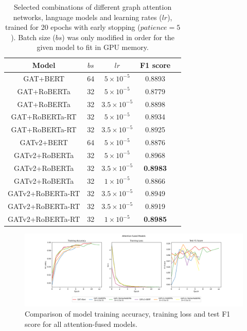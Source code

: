 \documentclass[letterpaper]{article} %
\begin{document}
\begin{table}
    \begin{tabular}{|c|c|c|c|c|}
        \hline
        \hline 
        Model & $bs$ & $lr$ & F1 score \\
        \hline
        GAT+BERT & 64 & $5\times10^{-5}$ &  0.8893 \\
        GAT+RoBERTa & 32 & $5\times10^{-5}$ &  0.8779 \\
        GAT+RoBERTa & 32 & $3.5\times10^{-5}$ &  0.8898 \\
        GAT+RoBERTa-RT & 32 & $5\times10^{-5}$  & 0.8934 \\
        GAT+RoBERTa-RT & 32 & $3.5\times10^{-5}$  & 0.8925 \\
        GATv2+BERT & 64 & $5\times10^{-5}$  & 0.8876 \\
        GATv2+RoBERTa & 32 & $5\times10^{-5}$ &  0.8968 \\
        GATv2+RoBERTa & 32 & $3.5\times10^{-5}$ &  \textbf{0.8983} \\
        GATv2+RoBERTa & 32 & $1\times10^{-5}$ &  0.8866 \\
        GATv2+RoBERTa-RT & 32 & $3.5\times10^{-5}$  & 0.8949 \\
        GATv2+RoBERTa-RT & 32 & $3.5\times10^{-5}$  & 0.8919 \\
        GATv2+RoBERTa-RT & 32 & $1\times10^{-5}$  & \textbf{0.8985} \\
        \hline
    \end{tabular}
    \caption{Selected combinations of different graph attention networks, language models and learning rates ($lr$), trained for 20 epochs with early stopping ($patience=5$). Batch size ($bs$) was only modified in order for the given model to fit in GPU memory.}
\end{table}

\begin{figure}
    \includegraphics[width=\linewidth]{all_joint.png}
    \caption{Comparison of model training accuracy, training loss and test F1 score for all attention-fused models.}
\end{figure}
\end{document}
